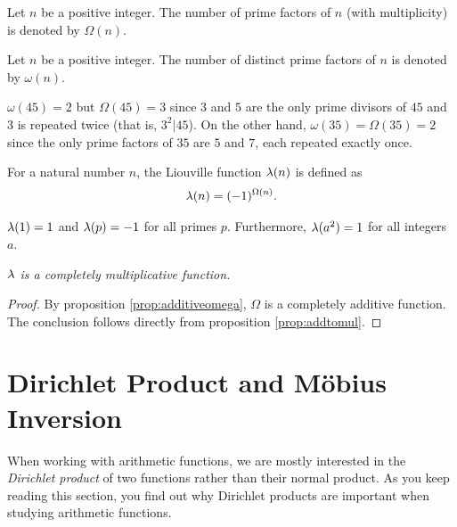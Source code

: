 \documentclass[12pt]{subfile}
\begin{document}
		\begin{definition}
			Let $n$ be a positive integer. The number of prime factors of $n$ (with multiplicity) is denoted by $\Omega(n)$.
		\end{definition}
		
		\begin{definition}
			Let $n$ be a positive integer. The number of distinct prime factors of $n$ is denoted by $\omega(n)$.
		\end{definition}
		
		\begin{example}
			$\omega(45)=2$ but $\Omega(45)=3$ since $3$ and $5$ are the only prime divisors of $45$ and $3$ is repeated twice (that is, $3^2|45$). On the other hand, $\omega(35)=\Omega(35)=2$ since the only prime factors of $35$ are $5$ and $7$, each repeated exactly once.
		\end{example}
	
		\begin{definition}
			For a natural number $n$, the Liouville function $\lambda (n)$ is defined as
			\begin{align*}
			\lambda (n) =  (-1)^{\Omega(n)}.
			\end{align*}
		\end{definition}
		
		\begin{example}
			$\lambda (1) = 1$ and $\lambda (p)=-1$ for all primes $p$. Furthermore, $\lambda (a^2) =1$ for all integers $a$.
		\end{example}
		
		\begin{theorem}\slshape
			$\lambda $ is a completely multiplicative function.
		\end{theorem}
		
		\begin{proof}
			By proposition \eqref{prop:additiveomega}, $\Omega$ is a completely additive function. The conclusion follows directly from proposition \eqref{prop:addtomul}.
		\end{proof}
	
\section{Dirichlet Product and M\" {o}bius Inversion}\label{sec:dirichletmobius}

	When working with arithmetic functions, we are mostly interested in the \textit{Dirichlet product} of two functions rather than their normal product. As you keep reading this section, you find out why Dirichlet products are important when studying arithmetic functions.
	
\end{document}
